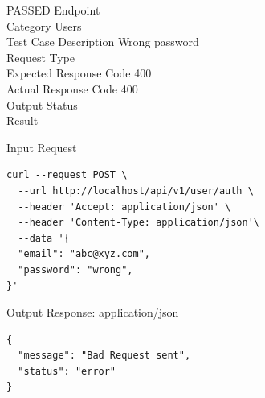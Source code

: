 \begin{testcase}{48}{PASSED}
Endpoint \hfill {}\\
Category \hfill Users\\
Test Case Description \hfill Wrong password\\

Request Type    \hfill {}\\
Expected Response Code    \hfill 400\\
Actual Response Code    \hfill 400\\

Output Status \hfill {}\\
Result \hfill {}

\begin{ipblock}{Input Request}
\begin{verbatim}
curl --request POST \
  --url http://localhost/api/v1/user/auth \
  --header 'Accept: application/json' \
  --header 'Content-Type: application/json'\
  --data '{
  "email": "abc@xyz.com",
  "password": "wrong",
}'
\end{verbatim}
\end{ipblock}

\begin{opblock}{Output Response: application/json}
\begin{verbatim}
{
  "message": "Bad Request sent",
  "status": "error"
}
\end{verbatim}
\end{opblock}
\end{testcase}


